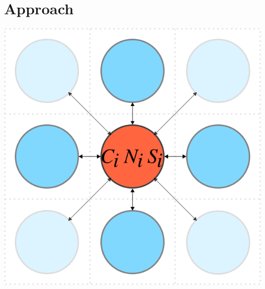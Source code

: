 \graphicspath{{images_low_res/}}
\section{Approach}
\label{sec:approach}

\begin{Figure}
  \centering
  \includegraphics[width=\linewidth]{square_array}
\end{Figure}

